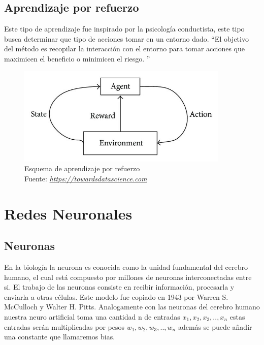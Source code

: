 \subsection{Aprendizaje por refuerzo}
Este tipo de aprendizaje fue inspirado por la psicología conductista, este tipo busca determinar que tipo de acciones tomar en un entorno dado. \textquotedblleft El objetivo del método es recopilar la interacción con el entorno para tomar acciones que maximicen el beneficio o minimicen el riesgo. \textquotedblright \cite{WEBSITE:1}
\begin{figure}[H]
	\centering
	\includegraphics[width=0.9\textwidth]{Figures/esquema.jpeg}
	\caption{Esquema de aprendizaje por refuerzo \\ Fuente:  \href{https://towardsdatascience.com/types-of-machine-learning-algorithms-you-should-know-953a08248861}{\textit{https://towardsdatascience.com}}}
	\label{refuerzo}
\end{figure} 


\section{Redes Neuronales}
\subsection*{Neuronas}
En la biología la neurona es conocida como la unidad fundamental del cerebro humano, el cual está compuesto por millones de neuronas interconectadas entre si. El trabajo de las neuronas consiste en recibir información, procesarla y enviarla a otras células. Este modelo fue copiado en 1943 por Warren S. McCulloch y Walter H. Pitts. Analogamente con las neuronas del cerebro humano nuestra neuro artificial toma una cantidad n de entradas $x_{1}, x_{2}, x_{3}, .. , x_{n}$ estas entradas serán multiplicadas por pesos $w_{1}, w_{2}, w_{3}, .. , w_{n}$ además se puede añadir una constante que llamaremos bias. 

